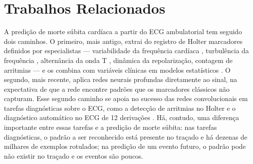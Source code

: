 
\chapter{Trabalhos Relacionados}
\label{cap:trabalhos-relacionados}

A predição de morte súbita cardíaca a partir do \gls{ECG} ambulatorial tem
seguido dois caminhos. O primeiro, mais antigo, extrai do registro de Holter
marcadores definidos por especialistas --- variabilidade da frequência
cardíaca \cite{taskforce1996heart,kleiger1987decreased}, turbulência da
frequência \cite{schmidt1999heart}, alternância da onda T
\cite{verrier2011microvolt}, dinâmica da repolarização, contagem de
arritmias --- e os combina com variáveis clínicas em modelos estatísticos
\cite{vazquez2009music,ramirez2017sudden}. O segundo, mais recente, aplica redes neurais
profundas diretamente ao sinal, na expectativa de que a rede encontre padrões
que os marcadores clássicos não capturam. Esse segundo caminho se apoia no
sucesso das redes convolucionais em tarefas diagnósticas sobre o \gls{ECG},
como a detecção de arritmias no Holter \cite{hannun2019cardiologist} e o
diagnóstico automático no \gls{ECG} de 12 derivações
\cite{ribeiro2020automatic}. Há, contudo, uma diferença importante entre
essas tarefas e a predição de morte súbita: nas tarefas diagnósticas, o
padrão a ser reconhecido está presente no traçado e há dezenas de milhares
de exemplos rotulados; na predição de um evento futuro, o padrão pode não
existir no traçado e os eventos são poucos.

